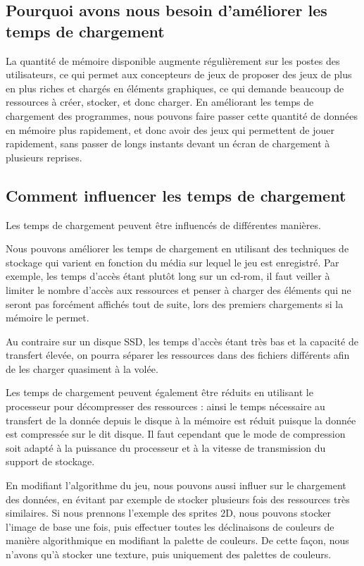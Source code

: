 \documentclass[a4paper, 11pt]{article} %
\begin{document}
\tableofcontents

\newpage
\subsection[Pourquoi améliorer les temps de chargement]{Pourquoi avons nous besoin d'améliorer les temps de chargement}
La quantité de mémoire disponible augmente régulièrement sur les postes des utilisateurs, ce qui permet aux concepteurs de jeux de proposer des jeux de plus en plus riches et chargés en éléments graphiques, ce qui demande beaucoup de ressources à créer, stocker, et donc charger. En améliorant les temps de chargement des programmes, nous pouvons faire passer cette quantité de données en mémoire plus rapidement, et donc avoir des jeux qui permettent de jouer rapidement, sans passer de longs instants devant un écran de chargement à plusieurs reprises.

\subsection[Comment les influencer]{Comment influencer les temps de chargement}
Les temps de chargement peuvent être influencés de différentes manières.

Nous pouvons améliorer les temps de chargement en utilisant des techniques de stockage qui varient en fonction du média sur lequel le jeu est enregistré. Par exemple, les temps d'accès étant plutôt long sur un cd-rom, il faut veiller à limiter le nombre d'accès aux ressources et penser à charger des éléments qui ne seront pas forcément affichés tout de suite, lors des premiers chargements si la mémoire le permet.

Au contraire sur un disque SSD, les temps d'accès étant très bas et la capacité de transfert élevée, on pourra séparer les ressources dans des fichiers différents afin de les charger quasiment à la volée.

Les temps de chargement peuvent également être réduits en utilisant le processeur pour décompresser des ressources : ainsi le temps nécessaire au transfert de la donnée depuis le disque à la mémoire est réduit puisque la donnée est compressée sur le dit disque. Il faut cependant que le mode de compression soit adapté à la puissance du processeur et à la vitesse de transmission du support de stockage.

\newpage
En modifiant l'algorithme du jeu, nous pouvons aussi influer sur le chargement des données, en évitant par exemple de stocker plusieurs fois des ressources très similaires. Si nous prennons l'exemple des sprites 2D, nous pouvons stocker l'image de base une fois, puis effectuer toutes les déclinaisons de couleurs de manière algorithmique en modifiant la palette de couleurs. De cette façon, nous n'avons qu'à stocker une texture, puis uniquement des palettes de couleurs.
\end{document}

